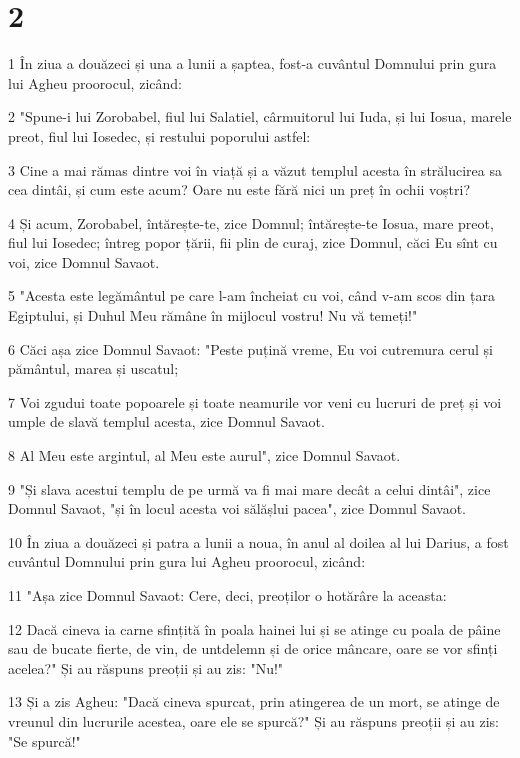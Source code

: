 \chapter{2}

\par 1 În ziua a douăzeci și una a lunii a șaptea, fost-a cuvântul Domnului prin gura lui Agheu proorocul, zicând:
\par 2 "Spune-i lui Zorobabel, fiul lui Salatiel, cârmuitorul lui Iuda, și lui Iosua, marele preot, fiul lui Iosedec, și restului poporului astfel:
\par 3 Cine a mai rămas dintre voi în viață și a văzut templul acesta în strălucirea sa cea dintâi, și cum este acum? Oare nu este fără nici un preț în ochii voștri?
\par 4 Și acum, Zorobabel, întărește-te, zice Domnul; întărește-te Iosua, mare preot, fiul lui Iosedec; întreg popor țării, fii plin de curaj, zice Domnul, căci Eu sînt cu voi, zice Domnul Savaot.
\par 5 "Acesta este legământul pe care l-am încheiat cu voi, când v-am scos din țara Egiptului, și Duhul Meu rămâne în mijlocul vostru! Nu vă temeți!"
\par 6 Căci așa zice Domnul Savaot: "Peste puțină vreme, Eu voi cutremura cerul și pământul, marea și uscatul;
\par 7 Voi zgudui toate popoarele și toate neamurile vor veni cu lucruri de preț și voi umple de slavă templul acesta, zice Domnul Savaot.
\par 8 Al Meu este argintul, al Meu este aurul", zice Domnul Savaot.
\par 9 "Și slava acestui templu de pe urmă va fi mai mare decât a celui dintâi", zice Domnul Savaot, "și în locul acesta voi sălășlui pacea", zice Domnul Savaot.
\par 10 În ziua a douăzeci și patra a lunii a noua, în anul al doilea al lui Darius, a fost cuvântul Domnului prin gura lui Agheu proorocul, zicând:
\par 11 "Așa zice Domnul Savaot: Cere, deci, preoților o hotărâre la aceasta:
\par 12 Dacă cineva ia carne sfințită în poala hainei lui și se atinge cu poala de pâine sau de bucate fierte, de vin, de untdelemn și de orice mâncare, oare se vor sfinți acelea?" Și au răspuns preoții și au zis: "Nu!"
\par 13 Și a zis Agheu: "Dacă cineva spurcat, prin atingerea de un mort, se atinge de vreunul din lucrurile acestea, oare ele se spurcă?" Și au răspuns preoții și au zis: "Se spurcă!"
